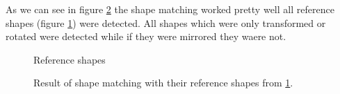 As we can see in figure \ref{fig:Result5_3} the shape matching worked pretty well all reference shapes (figure \ref{fig:Result5_2}) were detected. All shapes which were only transformed or rotated were detected while if they were mirrored they waere not. 

\begin{figure}
	\centering
	\caption{Reference shapes}
	\label{fig:Result5_2}
\end{figure}

\begin{figure}
	\centering
	\caption{Result of shape matching with their reference shapes from \ref{fig:Result5_2}.}
	\label{fig:Result5_3}
\end{figure}